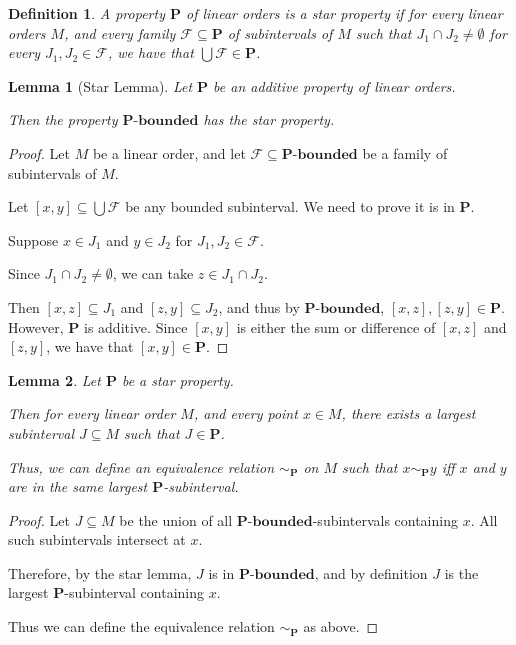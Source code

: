 \documentclass{article}
\newtheorem{lemma}{Lemma}
\newtheorem{definition}{Definition}
\newcommand{\bounded}[1]{{#1} \text{-} \mathbf{bounded}}
\newcommand{\pp}{\mathbf{P}}
\begin{document}
\begin{definition}
  A property $\pp$ of linear orders is a \emph{star property} if 
  for every linear orders $M$, and every family $\mathcal{F} \subseteq \pp$
  of subintervals of $M$ such that $J_1 \cap J_2 \ne \emptyset$
  for every $J_1, J_2 \in \mathcal{F}$, we have that
  $\bigcup \mathcal{F} \in \pp$.
\end{definition}

  
\begin{lemma}[Star Lemma]
  Let $\pp$ be an additive property of linear orders.

  Then the property $\bounded{\pp}$ has the star property.
\end{lemma}

\begin{proof}
  Let $M$ be a linear order,
  and let $\mathcal{F} \subseteq \bounded{\pp}$ be a family of subintervals of $M$.

  Let $[x, y] \subseteq \bigcup \mathcal{F}$ be any bounded subinterval. We need to prove 
  it is in $\pp$.

  Suppose $x \in J_1$ and $y \in J_2$ for $J_1, J_2 \in \mathcal{F}$.
  
  Since $J_1 \cap J_2 \ne \emptyset$, we can take $z \in J_1 \cap J_2$.

  Then $[x, z] \subseteq J_1$ and $[z, y] \subseteq J_2$,
  and thus by $\bounded{\pp}$, $[x, z], [z, y] \in \pp$.
  However, $\pp$ is additive. Since $[x, y]$ is either the sum
  or difference of $[x, z]$ and $[z, y]$, we have that $[x, y] \in \pp$.
\end{proof}

\begin{lemma}
  Let $\pp$ be a star property.

  Then for every linear order $M$,
  and every point $x \in M$, there exists a largest subinterval $J \subseteq M$ such that
  $J \in \pp$.

  Thus, we can define an equivalence relation $\sim_{\pp}$ on $M$ such that
  $x \sim_{\pp} y$ iff $x$ and $y$ are in the same largest $\pp$-subinterval.
\end{lemma}

\begin{proof}
  Let $J \subseteq M$ be the union of all $\bounded{\pp}$-subintervals containing $x$.
  All such subintervals intersect at $x$.

  Therefore, by the star lemma, $J$ is in $\bounded{\pp}$, and by definition
  $J$ is the largest $\pp$-subinterval containing $x$.

  Thus we can define the equivalence relation $\sim_{\pp}$ as above.
\end{proof}
\end{document}
